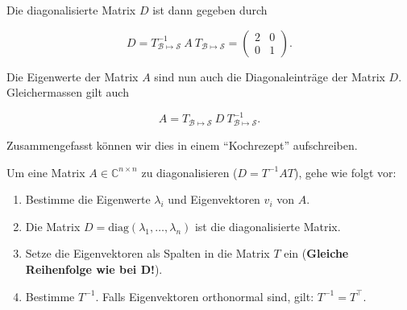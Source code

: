 Die diagonalisierte Matrix \( D \) ist dann gegeben durch

\begin{equation*}
    D = T_{\mathcal{B} \mapsto \mathcal{S} }^{-1} \ A \ T_{\mathcal{B} \mapsto \mathcal{S} } = \begin{pmatrix} 2 & 0 \\ 0 & 1 \end{pmatrix}.
\end{equation*}

Die Eigenwerte der Matrix \( A \) sind nun auch die Diagonaleinträge der Matrix \( D \). Gleichermassen gilt auch 

\begin{equation*}
    A = T_{\mathcal{B} \mapsto \mathcal{S} } \ D \ T_{\mathcal{B} \mapsto \mathcal{S} }^{-1}.
\end{equation*}

Zusammengefasst können wir dies in einem ``Kochrezept'' aufschreiben.

\begin{tcolorbox}[colback=gray!30, colframe=gray!80, title=Diagonalisieren]
    Um eine Matrix \( A \in \mathbb{C}^{n \times n} \) zu diagonalisieren (\( D = T^{-1}AT \)), gehe wie folgt vor:
    \begin{enumerate}
        \item Bestimme die Eigenwerte \( \lambda_i \) und Eigenvektoren \( v_i \) von \( A \).
        \item Die Matrix \( D = \text{diag}(\lambda_1, \dots , \lambda_n) \) ist die diagonalisierte Matrix.
        \item Setze die Eigenvektoren als Spalten in die Matrix \( T \) ein (\textbf{Gleiche Reihenfolge wie bei \( \mathbf{D} \)!}).
        \item Bestimme \( T^{-1} \). Falls Eigenvektoren orthonormal sind, gilt: \( T^{-1} = T^\top \).
    \end{enumerate}
\end{tcolorbox}